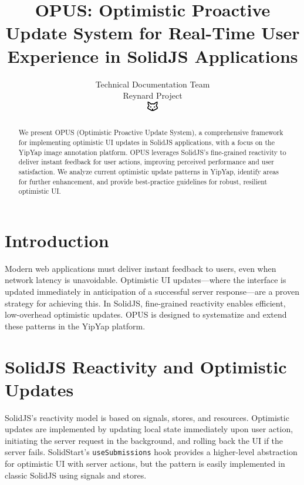 \documentclass[10pt]{article}
\begin{document}
\title{OPUS: Optimistic Proactive Update System for Real-Time User Experience in SolidJS Applications}

\author{Technical Documentation Team\\Reynard Project\\\includegraphics[width=0.5cm]{../nexus/favicon.pdf}}

\maketitle

\begin{abstract}
We present OPUS (Optimistic Proactive Update System), a comprehensive framework for implementing optimistic UI updates in SolidJS applications, with a focus on the YipYap image annotation platform. OPUS leverages SolidJS's fine-grained reactivity to deliver instant feedback for user actions, improving perceived performance and user satisfaction. We analyze current optimistic update patterns in YipYap, identify areas for further enhancement, and provide best-practice guidelines for robust, resilient optimistic UI.
\end{abstract}

\section{Introduction}
Modern web applications must deliver instant feedback to users, even when network latency is unavoidable. Optimistic UI updates---where the interface is updated immediately in anticipation of a successful server response---are a proven strategy for achieving this. In SolidJS, fine-grained reactivity enables efficient, low-overhead optimistic updates. OPUS is designed to systematize and extend these patterns in the YipYap platform.

\section{SolidJS Reactivity and Optimistic Updates}
SolidJS's reactivity model is based on signals, stores, and resources. Optimistic updates are implemented by updating local state immediately upon user action, initiating the server request in the background, and rolling back the UI if the server fails. SolidStart's \texttt{useSubmissions} hook provides a higher-level abstraction for optimistic UI with server actions, but the pattern is easily implemented in classic SolidJS using signals and stores.
\end{document}
